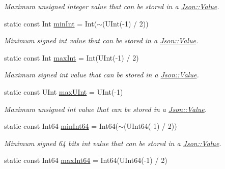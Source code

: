 \begin{DoxyCompactItemize}
\begin{DoxyCompactList}\small\item\em Maximum unsigned integer value that can be stored in a \hyperlink{class_json_1_1_value}{Json\-::\-Value}. \end{DoxyCompactList}\item 
\hypertarget{class_json_1_1_value_a7df8a39e2502b8c92a6a41e3d752d2c8}{static const Int \hyperlink{class_json_1_1_value_a7df8a39e2502b8c92a6a41e3d752d2c8}{min\-Int} = Int($\sim$(U\-Int(-\/1) / 2))}\label{class_json_1_1_value_a7df8a39e2502b8c92a6a41e3d752d2c8}

\begin{DoxyCompactList}\small\item\em Minimum signed int value that can be stored in a \hyperlink{class_json_1_1_value}{Json\-::\-Value}. \end{DoxyCompactList}\item 
\hypertarget{class_json_1_1_value_a978c799a8af3114ef7dab6fd0a310a1b}{static const Int \hyperlink{class_json_1_1_value_a978c799a8af3114ef7dab6fd0a310a1b}{max\-Int} = Int(U\-Int(-\/1) / 2)}\label{class_json_1_1_value_a978c799a8af3114ef7dab6fd0a310a1b}

\begin{DoxyCompactList}\small\item\em Maximum signed int value that can be stored in a \hyperlink{class_json_1_1_value}{Json\-::\-Value}. \end{DoxyCompactList}\item 
\hypertarget{class_json_1_1_value_ac79e63ee68d3aa914bfd6988be669b87}{static const U\-Int \hyperlink{class_json_1_1_value_ac79e63ee68d3aa914bfd6988be669b87}{max\-U\-Int} = U\-Int(-\/1)}\label{class_json_1_1_value_ac79e63ee68d3aa914bfd6988be669b87}

\begin{DoxyCompactList}\small\item\em Maximum unsigned int value that can be stored in a \hyperlink{class_json_1_1_value}{Json\-::\-Value}. \end{DoxyCompactList}\item 
\hypertarget{class_json_1_1_value_a815ef899bc312c93bc426511acfe31a7}{static const Int64 \hyperlink{class_json_1_1_value_a815ef899bc312c93bc426511acfe31a7}{min\-Int64} = Int64($\sim$(U\-Int64(-\/1) / 2))}\label{class_json_1_1_value_a815ef899bc312c93bc426511acfe31a7}

\begin{DoxyCompactList}\small\item\em Minimum signed 64 bits int value that can be stored in a \hyperlink{class_json_1_1_value}{Json\-::\-Value}. \end{DoxyCompactList}\item 
\hypertarget{class_json_1_1_value_a4492634870b8c5709ce967b384ac6006}{static const Int64 \hyperlink{class_json_1_1_value_a4492634870b8c5709ce967b384ac6006}{max\-Int64} = Int64(U\-Int64(-\/1) / 2)}\label{class_json_1_1_value_a4492634870b8c5709ce967b384ac6006}


\end{DoxyCompactItemize}
